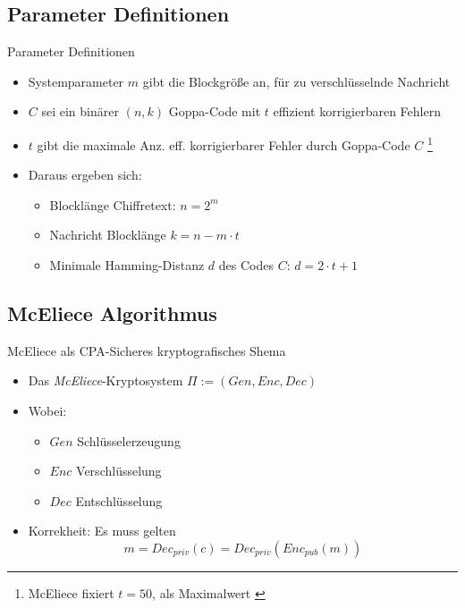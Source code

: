 \documentclass[11pt%
,aspectratio=169%
]{beamer}
\begin{document}
\subsection{Parameter Definitionen}
\begin{frame}{Parameter Definitionen}
    \begin{itemize}
        \item Systemparameter $m$ gibt die Blockgröße an, für zu verschlüsselnde Nachricht
        \item $C$ sei ein binärer $(n,k)$ Goppa-Code mit $t$ effizient korrigierbaren Fehlern
        \item $t$ gibt die maximale Anz. eff. korrigierbarer Fehler durch Goppa-Code $C$ \footnote{McEliece fixiert $t=50$, als Maximalwert \cite{McEliece1978public}}
        \item Daraus ergeben sich:
        \begin{itemize}
            \item Blocklänge Chiffretext: $n = 2^m$
            \item Nachricht Blocklänge $k = n - m \cdot t$
            \item Minimale Hamming-Distanz $d$ des Codes $C$: $d = 2 \cdot t + 1$
        \end{itemize}
    \end{itemize}   
\end{frame}

\subsection{McEliece Algorithmus}
\begin{frame}{McEliece als CPA-Sicheres kryptografisches Shema}
    \begin{itemize}
        \item Das \emph{McEliece}-Kryptosystem $\Pi := (Gen, Enc, Dec)$
        \item Wobei:
        \begin{itemize}
            \item $Gen$ Schlüsselerzeugung
            \item $Enc$ Verschlüsselung
            \item $Dec$ Entschlüsselung
        \end{itemize}
        \item Korrekheit: Es muss gelten
        $$
            m = Dec_{priv}(c) = Dec_{priv} (Enc_{pub}(m))
        $$
    \end{itemize}
\end{frame}
\end{document}
